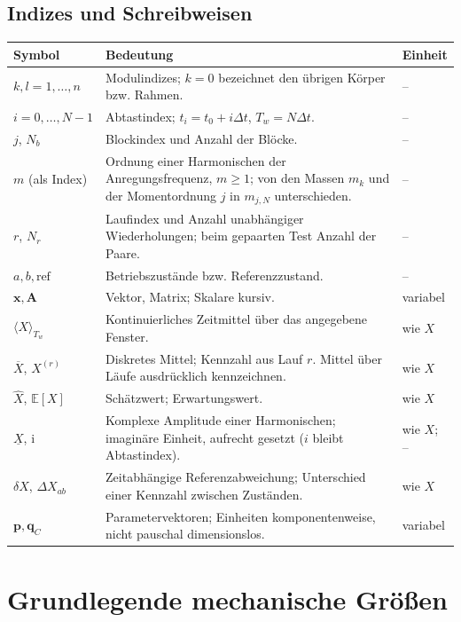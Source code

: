 \documentclass[11pt,a4paper]{article}
\makeatletter
\newcommand{\E}{\mathbb{E}}
\newenvironment{symtab}{\begin{longtable}{@{}L{.22\textwidth}L{.62\textwidth}L{.12\textwidth}@{}}\toprule\textbf{Symbol}&\textbf{Bedeutung}&\textbf{Einheit}\\\midrule\endhead}{\bottomrule\end{longtable}}
\makeatother
\begin{document}
\subsection{Indizes und Schreibweisen}
\begin{symtab}
$k,l=1,\ldots,n$&Modulindizes; $k=0$ bezeichnet den übrigen Körper bzw. Rahmen.&--\\
$i=0,\ldots,N-1$&Abtastindex; $t_i=t_0+i\Delta t$, $T_w=N\Delta t$.&--\\
$j$, $N_b$&Blockindex und Anzahl der Blöcke.&--\\
$m$ (als Index)&Ordnung einer Harmonischen der Anregungsfrequenz, $m\ge1$; von den Massen $m_k$ und der Momentordnung $j$ in $m_{j,N}$ unterschieden.&--\\
$r$, $N_r$&Laufindex und Anzahl unabhängiger Wiederholungen; beim gepaarten Test Anzahl der Paare.&--\\
$a,b,\mathrm{ref}$&Betriebszustände bzw. Referenzzustand.&--\\
$\mathbf x,\mathbf A$&Vektor, Matrix; Skalare kursiv.&variabel\\
$\langle X\rangle_{T_w}$&Kontinuierliches Zeitmittel über das angegebene Fenster.&wie $X$\\
$\overline X$, $X^{(r)}$&Diskretes Mittel; Kennzahl aus Lauf $r$. Mittel über Läufe ausdrücklich kennzeichnen.&wie $X$\\
$\hat X$, $\E[X]$&Schätzwert; Erwartungswert.&wie $X$\\
$\underline{X}$, $\mathrm i$&Komplexe Amplitude einer Harmonischen; imaginäre Einheit, aufrecht gesetzt ($i$ bleibt Abtastindex).&wie $X$; --\\
$\delta X$, $\Delta X_{ab}$&Zeitabhängige Referenzabweichung; Unterschied einer Kennzahl zwischen Zuständen.&wie $X$\\
$\mathbf p,\mathbf q_C$&Parametervektoren; Einheiten komponentenweise, nicht pauschal dimensionslos.&variabel\\
\end{symtab}

\section{Grundlegende mechanische Größen}
\end{document}
